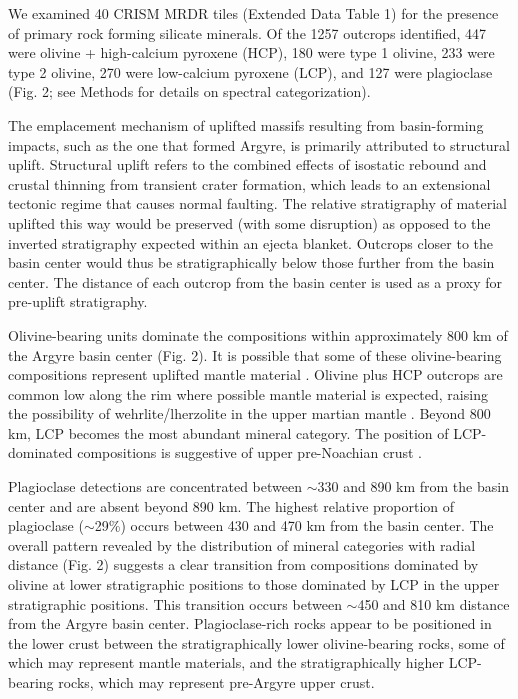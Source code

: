 \documentclass[11pt]{article}
\begin{document}
We examined 40 CRISM MRDR tiles (Extended Data Table 1) for the presence of primary rock forming silicate minerals. Of the 1257 outcrops identified, 447 were olivine + high-calcium pyroxene (HCP), 180 were type 1 olivine, 233 were type 2 olivine, 270 were low-calcium pyroxene (LCP), and 127 were plagioclase (Fig. 2; see Methods for details on spectral categorization).

The emplacement mechanism of uplifted massifs resulting from basin-forming impacts, such as the one that formed Argyre, is primarily attributed to structural uplift. Structural uplift refers to the combined effects of isostatic rebound and crustal thinning from transient crater formation, which leads to an extensional tectonic regime that causes normal faulting. The relative stratigraphy of material uplifted this way would be preserved (with some disruption) as opposed to the inverted stratigraphy expected within an ejecta blanket. Outcrops closer to the basin center would thus be stratigraphically below those further from the basin center. The distance of each outcrop from the basin center is used as a proxy for pre-uplift stratigraphy.

Olivine-bearing units dominate the compositions within approximately 800 km of the Argyre basin center (Fig. 2). It is possible that some of these olivine-bearing compositions represent uplifted mantle material \citep{Koeppen2008, Ody2013}. Olivine plus HCP outcrops are common low along the rim where possible mantle material is expected, raising the possibility of wehrlite/lherzolite in the upper martian mantle \citep{McGetchin1978, Treiman2025, Bernadet2025}. Beyond 800 km, LCP becomes the most abundant mineral category. The position of LCP-dominated compositions is suggestive of upper pre-Noachian crust \citep{Buczkowski2010, McNeil2025}.

Plagioclase detections are concentrated between $\sim$330 and 890 km from the basin center and are absent beyond 890 km. The highest relative proportion of plagioclase ($\sim$29\%) occurs between 430 and 470 km from the basin center. The overall pattern revealed by the distribution of mineral categories with radial distance (Fig. 2) suggests a clear transition from compositions dominated by olivine at lower stratigraphic positions to those dominated by LCP in the upper stratigraphic positions. This transition occurs between $\sim$450 and 810 km distance from the Argyre basin center. Plagioclase-rich rocks appear to be positioned in the lower crust between the stratigraphically lower olivine-bearing rocks, some of which may represent mantle materials, and the stratigraphically higher LCP-bearing rocks, which may represent pre-Argyre upper crust.
\end{document}

